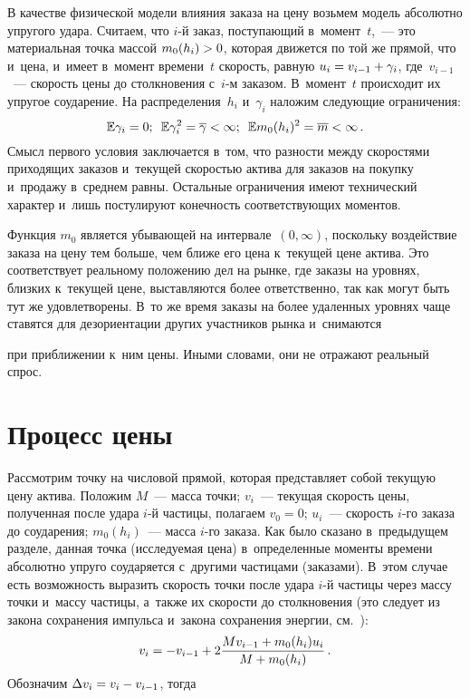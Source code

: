 \begin{multicols}{2}
В качестве физической модели влияния заказа на цену возьмем модель абсолютно 
упругого удара.  Считаем, что $i$-й заказ, поступающий в~момент~$t$,~--- 
это материальная точка массой $m_0(h_i)\hm>0$, которая движется по той же прямой, 
что и~цена, и~имеет в~момент времени~$t$ скорость, равную $u_i \hm= v_{i-1}\hm+\gamma_i$, 
где~$v_{i-1}$~--- скорость цены до столкновения с~$i$-м заказом. В~момент~$t$ 
происходит их упругое соударение. На распределения~$h_i$ и~$\gamma_i$ 
наложим следующие ограничения:
\begin{equation}
\mathbb{E}\gamma_i = 0;\enskip
\mathbb{E}\gamma_i^2 = \overline{\gamma}<\infty;\enskip
\mathbb{E}m_0(h_i)^2 = \overline{m} < \infty\,.
\label{e1-naz}
\end{equation}
Смысл первого условия заключается в~том, что разности между скоростями 
приходящих заказов и~текущей скоростью актива для заказов на покупку и~продажу 
в~среднем равны. Остальные ограничения имеют технический характер и~лишь постулируют 
конечность соответствующих моментов.

Функция $m_0$ является убывающей на интервале~$(0, \infty)$, поскольку 
воздействие заказа на цену тем больше, чем ближе его цена к~текущей цене актива.
Это соответствует реальному положению дел на рынке, где заказы на уровнях, 
близких к~текущей цене, выставляются более ответственно, так как могут быть 
тут же удовлетворены. В~то же время заказы на более удаленных уровнях чаще 
ставятся для дезориентации других участников  рынка и~снимаются\linebreak\vspace*{-12pt}

\columnbreak

\noindent
 при приближении к~ним 
цены. Иными словами, они не отражают реальный спрос. 

\vspace*{-7pt}

\section{Процесс цены}

Рассмотрим точку на числовой прямой, которая представляет собой текущую цену 
актива. Положим 
$M$~--- масса точки; 
$v_{i}$~--- текущая скорость цены, полученная после удара $i$-й частицы, 
полагаем $v_ {0}=0$; 
$u_{i}$~--- ско\-рость $i$-го заказа до соударения; 
$m_0(h_i)$~--- масса $i$-го заказа. 
Как было сказано в~предыду\-щем разделе, данная точ\-ка (исследуемая цена) 
в~определенные моменты времени абсолютно упруго соударяется с~другими 
частицами (заказами). В~этом случае есть возможность выразить ско\-рость точки после 
удара $i$-й час\-ти\-цы через массу точ\-ки и~массу час\-ти\-цы, а~также их ско\-рости 
до столк\-но\-ве\-ния (это следует из закона сохранения импульса и~закона сохранения 
энергии, см.~\cite[гл.~4, \S\,28]{third}):
\begin{equation*}
v_i = -v_{i-1} +2\displaystyle\frac{\displaystyle Mv_{i-1}+ m_0(h_i)u_i\mathstrut}{\displaystyle M+ m_0(h_i)\mathstrut}\,.
\end{equation*}
Обозначим $\Delta v_i \hm= v_i - v_{i-1}$, тогда


\end{multicols}
